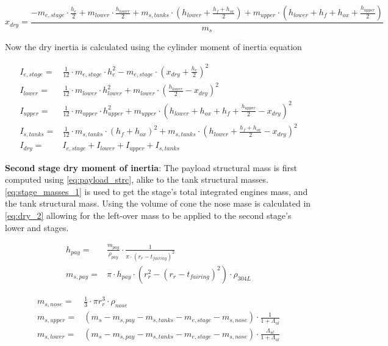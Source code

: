 \begin{equation}
    x_{dry} = \frac{-m_{e,stage} \cdot \frac{h_e}{2} + m_{lower} \cdot \frac{h_{lower}}{2} + m_{s,tanks} \cdot (h_{lower} + \frac{h_f + h_{ox}}{2}) + m_{upper} \cdot (h_{lower} + h_f + h_{ox} + \frac{h_{upper}}{2})}{m_s}
\label{eq:dry_cog}
\end{equation}

Now the dry inertia is calculated using the cylinder moment of inertia equation

\begin{equation}
\begin{aligned}
    I_{e,stage} =& \frac{1}{12} \cdot m_{e,stage} \cdot h_e^2 - m_{e,stage} \cdot (x_{dry} + \frac{h_e}{2})^2 \\
    I_{lower} =& \frac{1}{12} \cdot m_{lower} \cdot h_{lower}^2 + m_{lower} \cdot (\frac{h_{lower}}{2} - x_{dry})^2 \\
    I_{upper} =& \frac{1}{12} \cdot m_{upper} \cdot h_{upper}^2 + m_{upper} \cdot (h_{lower} + h_{ox} + h_f + \frac{h_{upper}}{2} - x_{dry})^2 \\
    I_{s,tanks} =& \frac{1}{12} \cdot m_{s,tanks} \cdot (h_f + h_{ox})^2 + m_{s,tanks} \cdot (h_{lower} + \frac{h_f + h_{ox}}{2} - x_{dry})^2 \\
    I_{dry} =& I_{e,stage} + I_{lower} + I_{upper} + I_{s,tanks}
\end{aligned}
\label{eq:dry_inertia_1}
\end{equation}

\textbf{Second stage dry moment of inertia}: The payload structural mass is first computed using \autoref{eq:payload_strc}, alike to the tank structural masses. \autoref{eq:stage_masses_1} is used to get the stage's total integrated engines mass, and the tank structural mass. Using the volume of cone the nose mase is calculated in \autoref{eq:dry_2} allowing for the left-over mass to be applied to the second stage's lower and stages.

\begin{equation}
\begin{aligned}
    h_{pay} =& \frac{m_{pay}}{\rho_{pay}} \cdot \frac{1}{\pi \cdot (r_r - t_{fairing})^2} \\
    m_{s,pay} =& \pi \cdot h_{pay} \cdot (r_r^2 - (r_r - t_{fairing})^2) \cdot \rho_{304L}
\end{aligned}
\label{eq:payload_strc}
\end{equation}

\begin{equation}
\begin{aligned}
    m_{s,nose} =& \frac{1}{3} \cdot \pi r_r^3 \cdot \rho_{nose}\\
    m_{s,upper} =& (m_s - m_{s,pay} - m_{s,tanks} - m_{e,stage} - m_{s,nose}) \cdot \frac{1}{1 + \Lambda_{ul}}\\
    m_{s,lower} =& (m_s - m_{s,pay} - m_{s,tanks} - m_{e,stage} - m_{s,nose}) \cdot \frac{\Lambda_{ul}}{1 + \Lambda_{ul}}\\
\end{aligned}
\label{eq:dry_2}
\end{equation}

